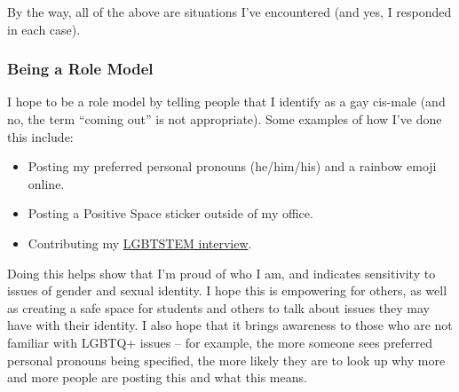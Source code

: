 \documentclass[]{article}
\providecommand{\tightlist}{%
  \setlength{\itemsep}{0pt}\setlength{\parskip}{0pt}}
\begin{document}
By the way, all of the above are situations I've encountered (and yes, I responded in each case).

\hypertarget{being-a-role-model}{%
\subsubsection{Being a Role Model}\label{being-a-role-model}}

I hope to be a role model by telling people that I identify as a gay cis-male (and no, the term ``coming out'' is not appropriate). Some examples of how I've done this include:

\begin{itemize}
\tightlist
\item
  Posting my preferred personal pronouns (he/him/his) and a rainbow emoji online.
\item
  Posting a Positive Space sticker outside of my office.
\item
  Contributing my \href{https://lgbtstem.wordpress.com/2019/11/09/an-interview-with-vincenzo-coia/}{LGBTSTEM interview}.
\end{itemize}

Doing this helps show that I'm proud of who I am, and indicates sensitivity to issues of gender and sexual identity. I hope this is empowering for others, as well as creating a safe space for students and others to talk about issues they may have with their identity. I also hope that it brings awareness to those who are not familiar with LGBTQ+ issues -- for example, the more someone sees preferred personal pronouns being specified, the more likely they are to look up why more and more people are posting this and what this means.
\end{document}
